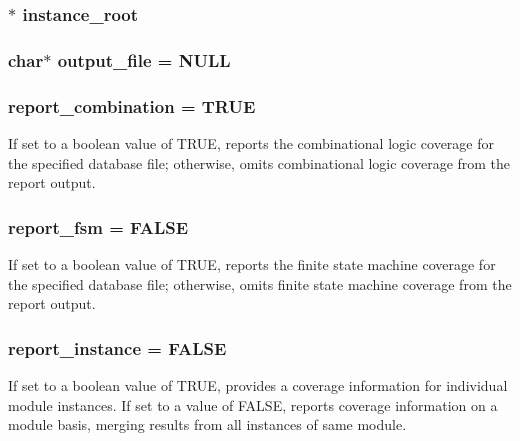\subsubsection{$\ast$ instance\_\-root}\label{report_8c_a8}


\subsubsection{\setlength{\rightskip}{0pt plus 5cm}char$\ast$ output\_\-file = NULL}\label{report_8c_a6}


\subsubsection{ report\_\-combination = TRUE}\label{report_8c_a2}


If set to a boolean value of TRUE, reports the combinational logic coverage for the specified database file; otherwise, omits combinational logic coverage from the report output. 
\subsubsection{ report\_\-fsm = FALSE}\label{report_8c_a3}


If set to a boolean value of TRUE, reports the finite state machine coverage for the specified database file; otherwise, omits finite state machine coverage from the report output. 
\subsubsection{ report\_\-instance = FALSE}\label{report_8c_a5}


If set to a boolean value of TRUE, provides a coverage information for individual module instances. If set to a value of FALSE, reports coverage information on a module basis, merging results from all instances of same module. 
